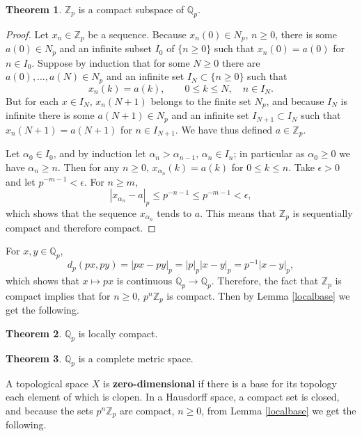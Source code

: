 \documentclass{article}
\theoremstyle{definition}
\newtheorem{theorem}{Theorem}
\theoremstyle{definition}
\begin{document}
\begin{theorem}
$\mathbb{Z}_p$ is a compact subspace of $\mathbb{Q}_p$.
\end{theorem}
\begin{proof}
Let $x_n \in \mathbb{Z}_p$ be a sequence. Because $x_n(0) \in N_p$, $n \geq 0$, there is some
$a(0) \in N_p$ and an infinite subset $I_0$ of $\{n \geq 0\}$ such that 
$x_n(0) = a(0)$ for $n \in I_0$. 
Suppose by induction that for some $N \geq 0$ there are $a(0),\ldots,a(N) \in N_p$ and 
an infinite set $I_N \subset \{n \geq 0\}$ such that
\[
x_n(k) = a(k),\qquad 0 \leq k \leq N, \quad n \in I_N.
\]
But for each $x \in I_N$, $x_n(N+1)$ belongs to the finite set $N_p$, and because $I_N$ is infinite there is
some $a(N+1) \in N_p$ and
an infinite set $I_{N+1} \subset I_N$ such that
$x_n(N+1) = a(N+1)$ for $n \in I_{N+1}$. 
We have thus defined $a \in \mathbb{Z}_p$. 

Let $\alpha_0 \in I_0$, and by induction let $\alpha_n > \alpha_{n-1}$, $\alpha_n \in I_n$; in particular
as $\alpha_0 \geq 0$ we have $\alpha_n \geq n$. 
Then for any $n \geq 0$,
$x_{\alpha_n}(k)=a(k)$ for $0 \leq k \leq n$. 
Take $\epsilon>0$ and let $p^{-m-1}<\epsilon$. For $n \geq m$,
\[
|x_{\alpha_n}-a|_p \leq p^{-n-1} \leq p^{-m-1}< \epsilon,
\]
which shows that the sequence $x_{\alpha_n}$ tends to $a$. This means that
$\mathbb{Z}_p$ is sequentially compact and therefore compact. 
\end{proof}



For $x,y \in \mathbb{Q}_p$,
\[
d_p(px,py) = |px-py|_p = |p|_p |x-y|_p = p^{-1} |x-y|_p,
\]
which shows that $x \mapsto px$ is continuous $\mathbb{Q}_p \to \mathbb{Q}_p$. 
Therefore, the fact that $\mathbb{Z}_p$ is compact implies that
for $n \geq 0$, $p^n \mathbb{Z}_p$ is compact. Then by Lemma \ref{localbase} we get the following.

\begin{theorem}
$\mathbb{Q}_p$ is locally compact.
\end{theorem}




\begin{theorem}
$\mathbb{Q}_p$ is a complete metric space.
\end{theorem}



A topological space $X$ is \textbf{zero-dimensional} 
if there is a base for its topology each element of which is clopen. In a Hausdorff space,
a compact set is closed, and because the sets $p^n \mathbb{Z}_p$ are compact, $n \geq 0$, from
Lemma \ref{localbase} we get the following.
\end{document}
